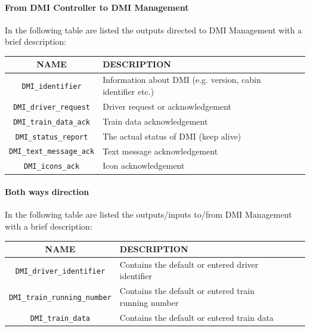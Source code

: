   \paragraph{From DMI Controller to DMI Management}
  In the following table are listed the outputs directed to DMI Management with a brief description:\\
    \begin{tabular}{| c | l | l | l | l |}
      \hline
      \textbf{NAME} & \textbf{DESCRIPTION} \\ \hline
      \texttt{DMI\_identifier} & Information about DMI (e.g. version, cabin identifier etc.)\\
      \texttt{DMI\_driver\_request} & Driver request or acknowledgement\\
      \texttt{DMI\_train\_data\_ack} & Train data acknowledgement\\
      \texttt{DMI\_status\_report} & The actual status of DMI (keep alive)\\
      \texttt{DMI\_text\_message\_ack} & Text message acknowledgement\\
      \texttt{DMI\_icons\_ack} & Icon acknowledgement\\

      \hline
    \end{tabular} 
    \label{tbl:DMICtrToDMIMng}
    
\paragraph{Both ways direction}
In the following table are listed the outputs/inputs  to/from DMI Management with a brief description:\\
  
    \begin{tabular}{| c | l | l | l | l |}
      \hline
      \textbf{NAME} & \textbf{DESCRIPTION} \\ \hline
      \texttt{DMI\_driver\_identifier} & Contains the default or entered driver identifier\\
      \texttt{DMI\_train\_running\_number} & Contains the default or entered train running number\\
      \texttt{DMI\_train\_data} & Contains the default or entered train data\\
      \hline
    \end{tabular} 
    \label{tbl:DMICtrToDMIMng}
  

